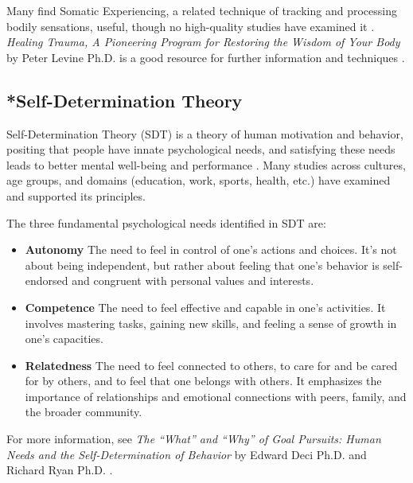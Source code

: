 \documentclass[12pt,letterpaper]{article}
\begin{document}
Many find Somatic Experiencing, a related technique of tracking and processing bodily sensations, useful, though no high-quality studies have examined it \cite{kuhfußSomatic}. \textit{Healing Trauma, A Pioneering Program for Restoring the Wisdom of Your Body} by Peter Levine Ph.D. is a good resource for further information and techniques \cite{levineSomatic}.
\subsection{*Self-Determination Theory}
\label{sec:sdt}
Self-Determination Theory (SDT) is a theory of human motivation and behavior, positing that people have innate psychological needs, and satisfying these needs leads to better mental well-being and performance \cite{deciSDT}. Many studies across cultures, age groups, and domains (education, work, sports, health, etc.) have examined and supported its principles.

The three fundamental psychological needs identified in SDT are:
\begin{itemize}
    \item \textbf{Autonomy} The need to feel in control of one's actions and choices. It's not about being independent, but rather about feeling that one's behavior is self-endorsed and congruent with personal values and interests.
    \item \textbf{Competence} The need to feel effective and capable in one's activities. It involves mastering tasks, gaining new skills, and feeling a sense of growth in one's capacities.
    \item \textbf{Relatedness} The need to feel connected to others, to care for and be cared for by others, and to feel that one belongs with others. It emphasizes the importance of relationships and emotional connections with peers, family, and the broader community.
\end{itemize}
For more information, see \textit{The “What” and “Why” of Goal Pursuits: Human Needs and the Self-Determination of Behavior} by Edward Deci Ph.D. and Richard Ryan Ph.D. \cite{deciSDT}.
\end{document}
